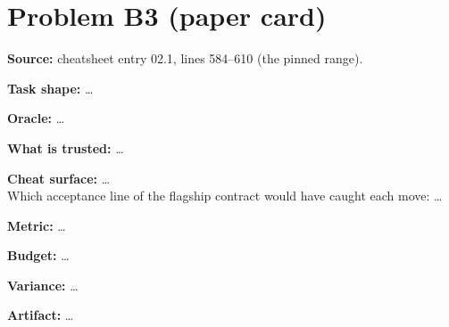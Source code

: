 \documentclass[11pt]{article}
\begin{document}
\section*{Problem B3 (paper card)}\label{ans:B3}
\begin{answer}
\textbf{Source:} cheatsheet entry 02.1, lines 584--610 (the pinned range).

\textbf{Task shape:} \dots

\textbf{Oracle:} \dots

\textbf{What is trusted:} \dots

\textbf{Cheat surface:} \dots \\
Which acceptance line of the flagship contract would have caught each move: \dots

\textbf{Metric:} \dots

\textbf{Budget:} \dots

\textbf{Variance:} \dots

\textbf{Artifact:} \dots
\end{answer}
\end{document}
